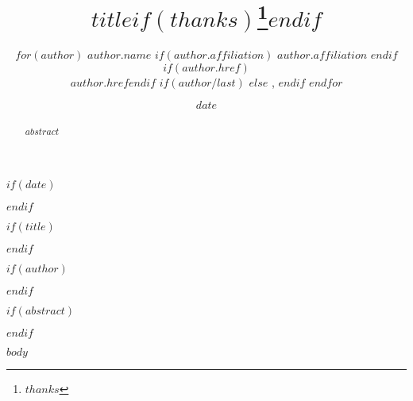 \documentclass{article}
\begin{document}
$if(date)$
\date{$date$}
$endif$

$if(title)$
\title{$title$$if(thanks)$\thanks{$thanks$}$endif$}
$endif$

$if(author)$
\author{
$for(author)$
$author.name$ $if(author.affiliation)$ \textit{$author.affiliation$} $endif$ $if(author.href)$\\\small{$author.href$}$endif$ $if(author/last)$ $else$ , $endif$
$endfor$
}
$endif$

\maketitle

$if(abstract)$
\begin{abstract}
$abstract$
\end{abstract}
$endif$


$body$
\end{document}
